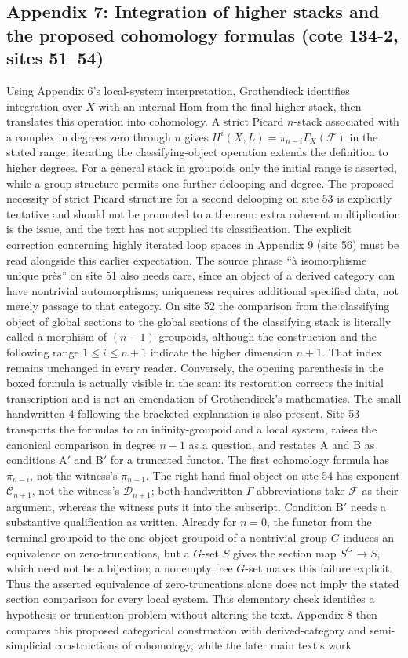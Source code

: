 \subsection*{Appendix 7: Integration of higher stacks and the proposed cohomology formulas (cote 134-2, sites 51--54)}
Using Appendix 6's local-system interpretation, Grothendieck identifies integration over $X$ with an internal Hom from the final higher stack, then translates this operation into cohomology. A strict Picard $n$-stack associated with a complex in degrees zero through $n$ gives $H^i(X,L)=\pi_{n-i}\Gamma_X(\mathcal F)$ in the stated range; iterating the classifying-object operation extends the definition to higher degrees. For a general stack in groupoids only the initial range is asserted, while a group structure permits one further delooping and degree. The proposed necessity of strict Picard structure for a second delooping on site 53 is explicitly tentative and should not be promoted to a theorem: extra coherent multiplication is the issue, and the text has not supplied its classification. The explicit correction concerning highly iterated loop spaces in Appendix 9 (site 56) must be read alongside this earlier expectation. The source phrase ``à isomorphisme unique près'' on site 51 also needs care, since an object of a derived category can have nontrivial automorphisms; uniqueness requires additional specified data, not merely passage to that category. On site 52 the comparison from the classifying object of global sections to the global sections of the classifying stack is literally called a morphism of $(n-1)$-groupoids, although the construction and the following range $1\leq i\leq n+1$ indicate the higher dimension $n+1$. That index remains unchanged in every reader. Conversely, the opening parenthesis in the boxed formula is actually visible in the scan: its restoration corrects the initial transcription and is not an emendation of Grothendieck's mathematics. The small handwritten 4 following the bracketed explanation is also present. Site 53 transports the formulas to an infinity-groupoid and a local system, raises the canonical comparison in degree $n+1$ as a question, and restates A and B as conditions A$'$ and B$'$ for a truncated functor. The first cohomology formula has $\pi_{n-i}$, not the witness's $\pi_{n-1}$. The right-hand final object on site 54 has exponent $\mathcal C_{n+1}$, not the witness's $\mathcal D_{n+1}$; both handwritten $\Gamma$ abbreviations take $\mathcal F$ as their argument, whereas the witness puts it into the subscript. Condition B$'$ needs a substantive qualification as written. Already for $n=0$, the functor from the terminal groupoid to the one-object groupoid of a nontrivial group $G$ induces an equivalence on zero-truncations, but a $G$-set $S$ gives the section map $S^G\to S$, which need not be a bijection; a nonempty free $G$-set makes this failure explicit. Thus the asserted equivalence of zero-truncations alone does not imply the stated section comparison for every local system. This elementary check identifies a hypothesis or truncation problem without altering the text. Appendix 8 then compares this proposed categorical construction with derived-category and semi-simplicial constructions of cohomology, while the later main text's work 